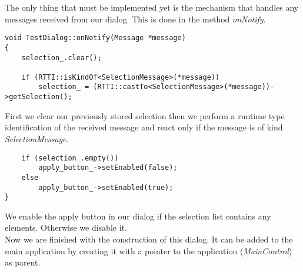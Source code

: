 The only thing that must be implemented yet is the mechanism that handles any
messages received from our dialog.
This is done in the method {\em onNotify}. 

\begin{verbatim}
void TestDialog::onNotify(Message *message)
{
	selection_.clear();

	if (RTTI::isKindOf<SelectionMessage>(*message))
		selection_ = (RTTI::castTo<SelectionMessage>(*message))->getSelection();
\end{verbatim}

First we clear our previously stored selection then we perform a runtime type identification
of the received message and react only if the message is of kind {\em SelectionMessage}.
	
\begin{verbatim}
	if (selection_.empty())
		apply_button_->setEnabled(false);
	else
		apply_button_->setEnabled(true);
}
\end{verbatim}

We enable the apply button in our dialog if the selection list contains any elements.
Otherwise we disable it.\\

Now we are finished with the construction of this dialog. It can be added to the main application
by creating it with a pointer to the application ({\em MainControl}) as
parent.

